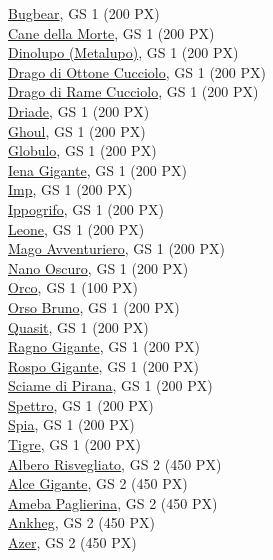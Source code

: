 \begin{multicols}{3}
{\hyperlink{Bugbear}{Bugbear}, GS 1 (200 PX)\\
\hyperlink{Cane della Morte}{Cane della Morte}, GS 1 (200 PX)\\
\hyperlink{Dinolupo (Metalupo)}{Dinolupo (Metalupo)}, GS 1 (200 PX)\\
\hyperlink{Drago di Ottone Cucciolo}{Drago di Ottone Cucciolo}, GS 1 (200 PX)\\
\hyperlink{Drago di Rame Cucciolo}{Drago di Rame Cucciolo}, GS 1 (200 PX)\\
\hyperlink{Driade}{Driade}, GS 1 (200 PX)\\
\hyperlink{Ghoul}{Ghoul}, GS 1 (200 PX)\\
\hyperlink{Globulo}{Globulo}, GS 1 (200 PX)\\
\hyperlink{Iena Gigante}{Iena Gigante}, GS 1 (200 PX)\\
\hyperlink{Imp}{Imp}, GS 1 (200 PX)\\
\hyperlink{Ippogrifo}{Ippogrifo}, GS 1 (200 PX)\\
\hyperlink{Leone}{Leone}, GS 1 (200 PX)\\
\hyperlink{Mago Avventuriero}{Mago Avventuriero}, GS 1 (200 PX)\\
\hyperlink{Nano Oscuro}{Nano Oscuro}, GS 1 (200 PX)\\
\hyperlink{Orco}{Orco}, GS 1 (100 PX)\\
\hyperlink{Orso Bruno}{Orso Bruno}, GS 1 (200 PX)\\
\hyperlink{Quasit}{Quasit}, GS 1 (200 PX)\\
\hyperlink{Ragno Gigante}{Ragno Gigante}, GS 1 (200 PX)\\
\hyperlink{Rospo Gigante}{Rospo Gigante}, GS 1 (200 PX)\\
\hyperlink{Sciame di Pirana}{Sciame di Pirana}, GS 1 (200 PX)\\
\hyperlink{Spettro}{Spettro}, GS 1 (200 PX)\\
\hyperlink{Spia}{Spia}, GS 1 (200 PX)\\
\hyperlink{Tigre}{Tigre}, GS 1 (200 PX)\\
\hyperlink{Albero Risvegliato}{Albero Risvegliato}, GS 2 (450 PX)\\
\hyperlink{Alce Gigante}{Alce Gigante}, GS 2 (450 PX)\\
\hyperlink{Ameba Paglierina}{Ameba Paglierina}, GS 2 (450 PX)\\
\hyperlink{Ankheg}{Ankheg}, GS 2 (450 PX)\\
\hyperlink{Azer}{Azer}, GS 2 (450 PX)\\
}
\end{multicols}
